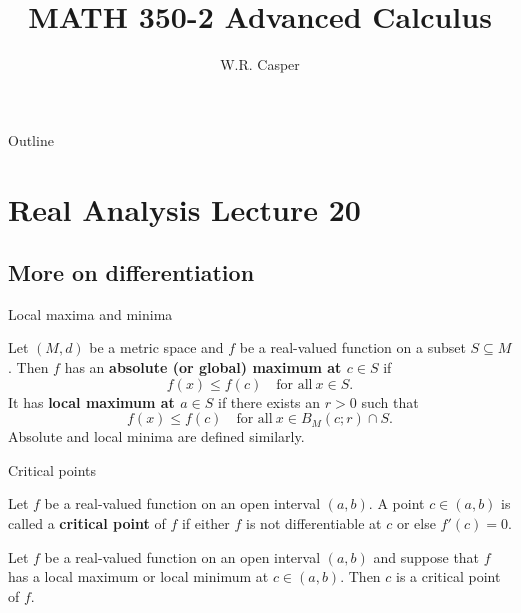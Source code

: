 \documentclass{beamer}
\title{MATH 350-2 Advanced Calculus}
\subtitle
{} %
\author[W.R. Casper] %
{W.R. Casper}
\institute[California State University Fullerton] %
{
  Department of Mathematics\\
  California State University Fullerton}
\begin{document}
\begin{frame}
  \titlepage
\end{frame}

\begin{frame}{Outline}
  \tableofcontents
\end{frame}



\section{Real Analysis Lecture 20}

\subsection{More on differentiation}

\begin{frame}{Local maxima and minima}
\begin{defn}
Let $(M,d)$ be a metric space and $f$ be a real-valued function on a subset $S\subseteq M$.
\pause
Then $f$ has an \textbf{absolute (or global) maximum at $c\in S$} if
$$f(x)\leq f(c)\quad\text{for all}\ x\in S.$$
\pause
It has \textbf{local maximum at $a\in S$} if there exists an $r>0$ such that
$$f(x)\leq f(c)\quad\text{for all}\ x\in B_M(c;r)\cap S.$$
\pause
Absolute and local minima are defined similarly.
\end{defn}
\end{frame}

\begin{frame}{Critical points}
\begin{defn}
Let $f$ be a real-valued function on an open interval $(a,b)$.
\pause
A point $c\in (a,b)$ is called a \textbf{critical point} of $f$ if either $f$ is not differentiable at $c$ or else $f'(c) = 0$.
\end{defn}
\pause
\begin{thm}
Let $f$ be a real-valued function on an open interval $(a,b)$ and suppose that $f$ has a local maximum or local minimum at $c\in (a,b)$.
Then $c$ is a critical point of $f$.
\end{thm}
\end{frame}
\end{document}
